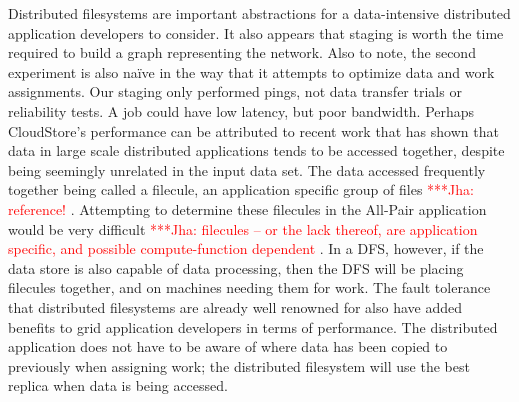 \documentclass[a4paper,11pt]{article}
\newcommand{\jhanote}[1]{ {\textcolor{red} { ***Jha: #1 }}}
\newcommand{\jhanote}[1]{}
\begin{document}
Distributed filesystems are important abstractions for a data-intensive distributed application developers to consider. It also appears that staging is worth the time required to build a graph representing the network. Also to note, the second experiment is also naïve in the way that it attempts to optimize data and work assignments. Our staging only performed pings, not data transfer trials or reliability tests. A job could have low latency, but poor bandwidth. Perhaps CloudStore's performance can be attributed to recent work that has shown that data in large scale distributed applications tends to be accessed together, despite being seemingly unrelated in the input data set. The data accessed frequently together being called a filecule, an application specific group of files \jhanote{reference!}. Attempting to determine these filecules in the All-Pair application would be very difficult\jhanote{filecules -- or the lack thereof, are application specific, and possible compute-function dependent}. In a DFS, however, if the data store is also capable of data processing, then the DFS will be placing filecules together, and on machines needing them for work. The fault tolerance that distributed filesystems are already well renowned for also have added benefits to grid application developers in terms of performance. The distributed application does not have to be aware of where data has been copied to previously when assigning work; the distributed filesystem will use the best replica when data is being accessed.

 

\end{document}

